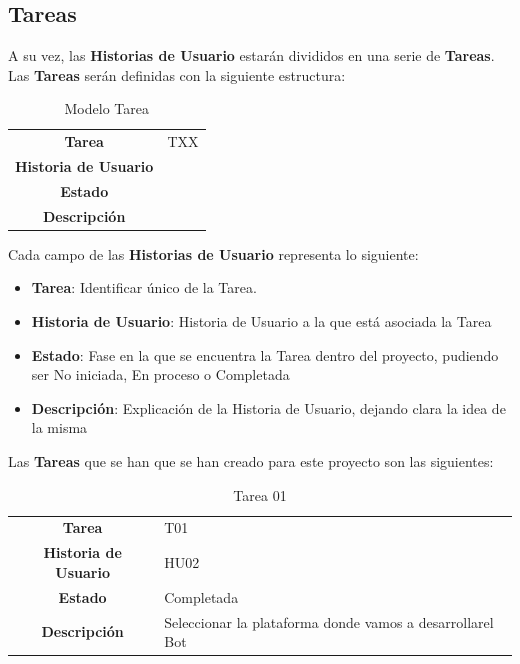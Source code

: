 \newpage
\subsection{Tareas}

A su vez, las \textbf{Historias de Usuario} estarán divididos en una serie de \textbf{Tareas}. Las \textbf{Tareas} serán definidas con la siguiente estructura:

\begin{table}[H]
	\begin{center}
		\begin{tabular}{| c | p{9cm} |}
			\hline
			
			\textbf{Tarea} & TXX \\
			\textbf{Historia de Usuario} &  \\
			\textbf{Estado} &  \\
			\textbf{Descripción} &  \\ \hline
		\end{tabular}
		\caption{Modelo Tarea}
	\end{center}
\end{table}

Cada campo de las \textbf{Historias de Usuario} representa lo siguiente:

\begin{itemize}
	\item \textbf{Tarea}: Identificar único de la Tarea.
	\item \textbf{Historia de Usuario}: Historia de Usuario a la que está asociada la Tarea
	\item \textbf{Estado}: Fase en la que se encuentra la Tarea dentro del proyecto, pudiendo ser No iniciada, En proceso o Completada
	\item \textbf{Descripción}: Explicación de la Historia de Usuario, dejando clara la idea de la misma
\end{itemize}

Las \textbf{Tareas} que se han que se han creado para este proyecto son las siguientes:

\begin{table}[H]
	\begin{center}
		\begin{tabular}{| c | p{9cm} |}
			\hline
			
			\textbf{Tarea} & T01 \\
			\textbf{Historia de Usuario} & HU02 \\
			\textbf{Estado} & Completada \\
			\textbf{Descripción} & Seleccionar la plataforma donde vamos a desarrollarel Bot \\ \hline
		\end{tabular}
		\caption{Tarea 01}
	\end{center}
\end{table}

